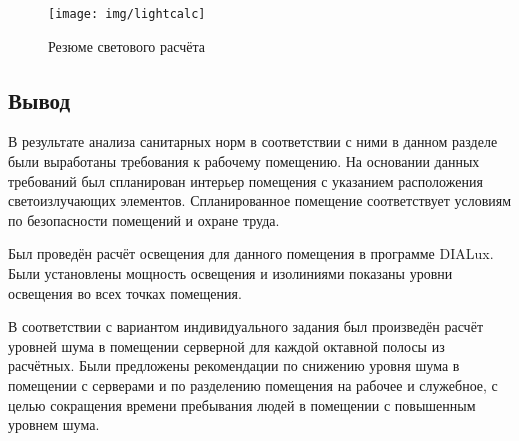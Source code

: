 \clearpage
\begin{figure}[h]
  \centering
  \texttt{[image: img/lightcalc]}
  \caption{Резюме светового расчёта}
  \label{fig:lightiso}
\end{figure}
\clearpage

\subsection{Вывод}

В результате анализа санитарных норм в соответствии с ними в данном разделе были выработаны требования к рабочему помещению. На основании данных требований был спланирован интерьер помещения с указанием расположения светоизлучающих элементов. Спланированное помещение соответствует условиям по безопасности помещений и охране труда.

Был проведён расчёт освещения для данного помещения в программе DIALux. Были установлены мощность освещения и изолиниями показаны уровни освещения во всех точках помещения.

В соответствии с вариантом индивидуального задания был произведён расчёт уровней шума в помещении серверной для каждой октавной полосы из расчётных. Были предложены рекомендации по снижению уровня шума в помещении с серверами и по разделению помещения на рабочее и служебное, с целью сокращения времени пребывания людей в помещении с повышенным уровнем шума.
